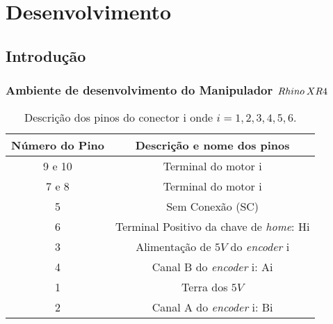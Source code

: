 


\chapter{Desenvolvimento\label{chap:Desenvolvimento}}



\section{Introdução}


\subsection{Ambiente de desenvolvimento do Manipulador $Rhino\: XR4$}

\begin{table}[h]
\hfill{}%
\begin{tabular}{|c|c|}
\hline 
Número do Pino & Descrição e nome dos pinos\tabularnewline
\hline 
\hline 
9 e 10 & Terminal do motor i\tabularnewline
\hline 
7 e 8 & Terminal do motor i\tabularnewline
\hline 
5 & Sem Conexão (SC)\tabularnewline
\hline 
6 & Terminal Positivo da chave de \textit{home}: Hi \tabularnewline
\hline 
3 & Alimentação de $5V$ do \textit{encoder }i\tabularnewline
\hline 
4 & Canal B do \textit{encoder }i: Ai\textit{ }\tabularnewline
\hline 
1 & Terra dos $5V$\tabularnewline
\hline 
2 & Canal A do \textit{encoder }i: Bi\tabularnewline
\hline 
\end{tabular}\hfill{}

\caption{\label{tab:RhinoAcinonamentoPinos}Descrição dos pinos do conector
i onde $i=1,2,3,4,5,6.$}
\end{table}

